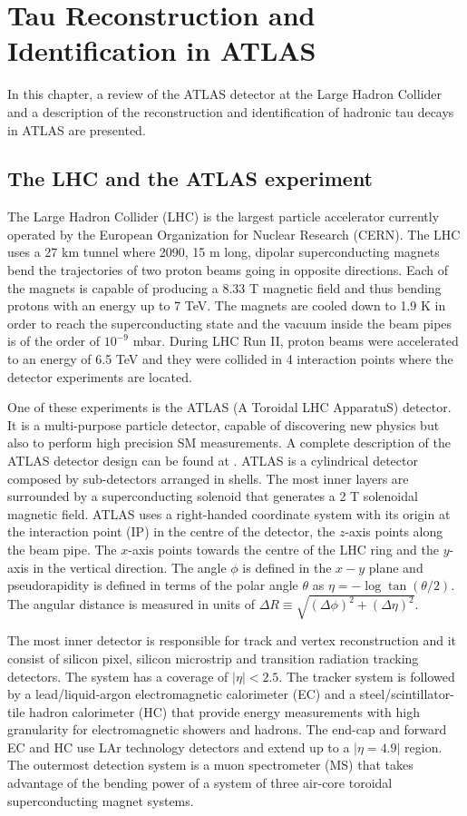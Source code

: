 \chapter{Tau Reconstruction and Identification in ATLAS}\label{ATLAS}
In this chapter, a review of the ATLAS detector at the Large Hadron Collider and a description of the reconstruction and identification of hadronic tau decays in ATLAS are presented.
\section{The LHC and the ATLAS experiment}
The Large Hadron Collider (LHC) is the largest particle accelerator currently operated by the European Organization for Nuclear Research (CERN). The LHC uses a 27 km tunnel where 2090, 15 m long, dipolar superconducting magnets bend the trajectories of two proton beams going in opposite directions. Each of the magnets is capable of producing a 8.33 T magnetic field and thus bending protons with an energy up to 7 TeV. The magnets are cooled down to 1.9 K in order to reach the superconducting state and the vacuum inside the beam pipes is of the order of $10^{-9}$ mbar. During LHC Run II, proton beams were accelerated to an energy of 6.5 TeV and they were collided in 4 interaction points where the detector experiments are located.

One of these experiments is the ATLAS (A Toroidal LHC ApparatuS) detector. It is a multi-purpose particle detector, capable of discovering new physics but also to perform high precision SM measurements. A complete description of the ATLAS detector design can be found at \cite{ATLAS:1999uwa}. ATLAS is a cylindrical detector composed by sub-detectors arranged in shells. The most inner layers are surrounded by a superconducting solenoid that generates a 2 T solenoidal magnetic field. ATLAS uses a right-handed coordinate system with its origin at the interaction point (IP) in the centre of the detector, the $z$-axis points along the beam pipe. The $x$-axis points towards the centre of the LHC ring and the $y$-axis in the vertical direction. The angle $\phi$ is defined in the $x-y$ plane and pseudorapidity is defined in terms of the polar angle $\theta$ as $\eta=-\log \tan(\theta/2)$. The angular distance is measured in units of $\Delta R\equiv \sqrt{(\Delta\phi)^2+(\Delta\eta)^2}$.

The most inner detector is responsible for track and vertex reconstruction and it consist of silicon pixel, silicon microstrip and transition radiation tracking detectors. The system has a coverage of $|\eta|<2.5$. The tracker system is followed by a lead/liquid-argon electromagnetic calorimeter (EC) and a steel/scintillator-tile hadron calorimeter (HC) that provide energy measurements with high granularity for electromagnetic showers and hadrons. The end-cap and forward EC and HC use LAr technology detectors and extend up to a $|\eta=4.9|$ region. The outermost detection system is a muon spectrometer (MS) that takes advantage of the bending power of a system of three air-core toroidal superconducting magnet systems.

